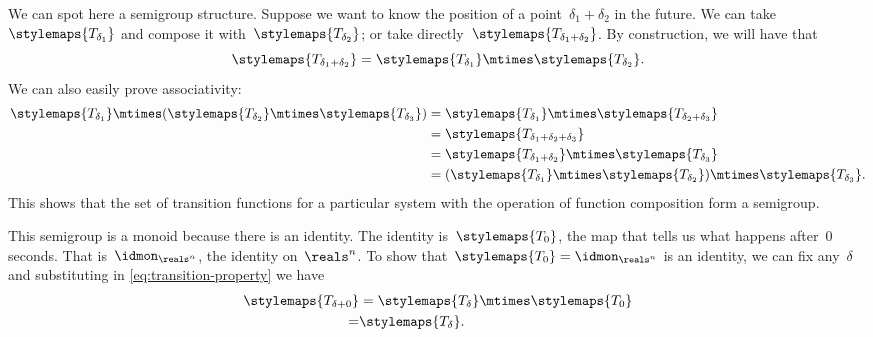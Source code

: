 We can spot here a semigroup structure.
Suppose we want to know the position of a point~$\delta_1 + \delta_2$
in the future.
We can take~$\stylemaps{T_{\delta_1}}$ and compose it with~$\stylemaps{T_{\delta_2}}$; or take directly~$\stylemaps{T_{\delta_1 + \delta_2}}$.
By construction, we will have that
\begin{equation}
    \label{eq:transition-property}
    \stylemaps{T_{\delta_1 + \delta_2}} = \stylemaps{T_{\delta_1}} \mtimes \stylemaps{T_{\delta_2}}.
\end{equation}
We can also easily prove associativity:
\begin{equation}
    \begin{aligned}
        \stylemaps{T_{\delta_1}}\mtimes (\stylemaps{T_{\delta_2}}\mtimes \stylemaps{T_{\delta_3}}) & =\stylemaps{T_{\delta_1}}\mtimes \stylemaps{T_{\delta_2+\delta_3}} \\
                                                                                                   & =\stylemaps{T_{\delta_1+\delta_2+\delta_3}} \\
                                                                                                   & =\stylemaps{T_{\delta_1+\delta_2}}\mtimes \stylemaps{T_{\delta_3}} \\
                                                                                                   & =(\stylemaps{T_{\delta_1}}\mtimes \stylemaps{T_{\delta_2}})\mtimes \stylemaps{T_{\delta_3}}.
    \end{aligned}
\end{equation}
%
This shows that the set of transition functions for a particular system with the operation of function composition form a semigroup.

This semigroup is a monoid because there is an identity.
The identity is~$\stylemaps{T_0}$, the map that tells us what happens after~$0$ seconds.
That is~$\idmon_{\reals^n}$, the identity on~$\reals^n$.
To show that~$\stylemaps{T_0} = \idmon_{\reals^n}$ is an identity, we can fix any~$\delta$ and substituting in \cref{eq:transition-property} we have
\begin{equation}
    \begin{aligned}
        \stylemaps{T_{\delta + 0}} & = \stylemaps{T_{\delta}} \mtimes \stylemaps{T_{0}} \\
        =                          & \stylemaps{T_{\delta}}.
    \end{aligned}
\end{equation}

